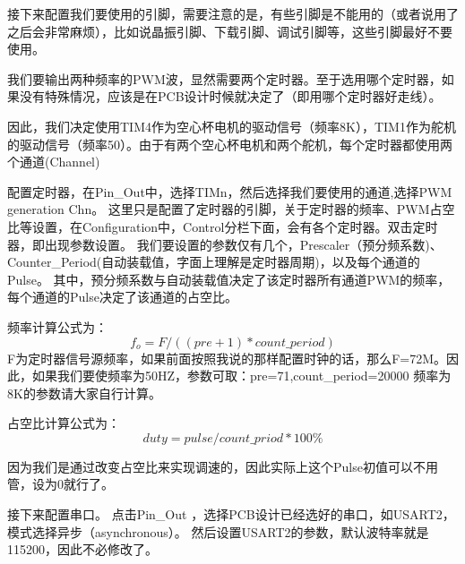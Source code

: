 \documentclass{article}
\begin{document}
接下来配置我们要使用的引脚，需要注意的是，有些引脚是不能用的（或者说用了之后会非常麻烦），比如说晶振引脚、下载引脚、调试引脚等，这些引脚最好不要使用。

我们要输出两种频率的PWM波，显然需要两个定时器。至于选用哪个定时器，如果没有特殊情况，应该是在PCB设计时候就决定了（即用哪个定时器好走线）。

因此，我们决定使用TIM4作为空心杯电机的驱动信号（频率8K），TIM1作为舵机的驱动信号（频率50）。由于有两个空心杯电机和两个舵机，每个定时器都使用两个通道(Channel)

配置定时器，在Pin\_Out中，选择TIMn，然后选择我们要使用的通道,选择PWM generation Chn。
这里只是配置了定时器的引脚，关于定时器的频率、PWM占空比等设置，在Configuration中，Control分栏下面，会有各个定时器。双击定时器，即出现参数设置。
我们要设置的参数仅有几个，Prescaler（预分频系数)、Counter\_Period(自动装载值，字面上理解是定时器周期)，以及每个通道的Pulse。
其中，预分频系数与自动装载值决定了该定时器所有通道PWM的频率，每个通道的Pulse决定了该通道的占空比。

频率计算公式为：
\begin{equation}
f_o=F/((pre+1) * count\_period)
\end{equation}
F为定时器信号源频率，如果前面按照我说的那样配置时钟的话，那么F=72M。因此，如果我们要使频率为50HZ，参数可取：pre=71,count\_period=20000
频率为8K的参数请大家自行计算。

占空比计算公式为：
\begin{equation}
duty=pulse/count\_priod*100\%
\end{equation}

因为我们是通过改变占空比来实现调速的，因此实际上这个Pulse初值可以不用管，设为0就行了。

接下来配置串口。
点击Pin\_Out ，选择PCB设计已经选好的串口，如USART2，模式选择异步（asynchronous）。
然后设置USART2的参数，默认波特率就是115200，因此不必修改了。
\end{document}
